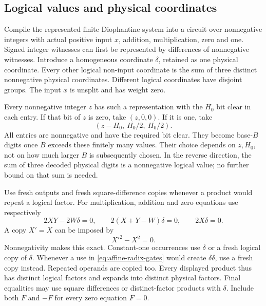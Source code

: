 \subsection{Logical values and physical coordinates}

Compile the represented finite Diophantine system into a circuit
over nonnegative integers with actual positive input $x$,
addition, multiplication, zero and one. Signed integer witnesses
can first be represented by differences of nonnegative witnesses.
Introduce a homogeneous coordinate $\delta$, retained as one
physical coordinate. Every other logical non-input coordinate is
the sum of three distinct nonnegative physical coordinates.
Different logical coordinates have disjoint groups. The input $x$
is unsplit and has weight zero.

Every nonnegative integer $z$ has such a representation with the
$H_0$ bit clear in each entry. If that bit of $z$ is zero, take
$(z,0,0)$. If it is one, take
\begin{equation}\label{eq:affine-radix-split}
 (z-H_0,\ H_0/2,\ H_0/2).
\end{equation}
All entries are nonnegative and have the required bit clear.
They become base-$B$ digits once $B$ exceeds these finitely many
values. Their choice depends on $z,H_0$, not on how much larger
$B$ is subsequently chosen. In the reverse direction, the sum
of three decoded physical digits is a nonnegative logical value;
no further bound on that sum is needed.

Use fresh outputs and fresh square-difference copies whenever a
product would repeat a logical factor. For multiplication,
addition and zero equations use respectively
\begin{equation}\label{eq:affine-radix-gates}
 2XY-2W\delta=0,\qquad
 2(X+Y-W)\delta=0,\qquad 2X\delta=0.
\end{equation}
A copy $X'=X$ can be imposed by
\begin{equation}\label{eq:affine-radix-copy}
 X'^2-X^2=0.
\end{equation}
Nonnegativity makes this exact. Constant-one occurrences use
$\delta$ or a fresh logical copy of $\delta$. Whenever a use
in \eqref{eq:affine-radix-gates} would create $\delta\delta$,
use a fresh copy instead. Repeated operands are copied too.
Every displayed product thus has distinct logical factors and
expands into distinct physical factors. Final equalities may
use square differences or distinct-factor products with
$\delta$. Include both $F$ and $-F$ for every zero equation
$F=0$.

